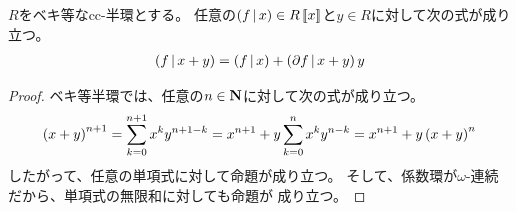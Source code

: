 {	\begin{proposition}\label{prop:Taylorの定理（ベキ等）} %
		$R$をベキ等なcc-半環とする。
		任意の$\mathinner{({f{\,|\,}x})}\in R\mathinner{[\![{x}]\!]}$と$y\in R$に対して次の式が成り立つ。
		\begin{equation*}\begin{split}
			\mathinner{({f{\,|\,}x + y})} = \mathinner{({f{\,|\,}x})} + \mathinner{({\partial f{\,|\,}x + y})}y
		\end{split}\end{equation*}
	\end{proposition} %
	\begin{proof} %
		ベキ等半環では、任意の$n\in\mathbf{N}$に対して次の式が成り立つ。
		\begin{equation*}\begin{split}
			\mathinner{({x+y})}^{n+1} = \sum_{k=0}^{n+1} x^ky^{n+1-k}
			= x^{n+1} + y\sum_{k=0}^n x^ky^{n-k}
			= x^{n+1} + y\mathinner{({x+y})}^n
		\end{split}\end{equation*}
		したがって、任意の単項式に対して命題が成り立つ。
		そして、係数環が$\omega$-連続だから、単項式の無限和に対しても命題が
		成り立つ。
	\end{proof} %
}\endgroup %
